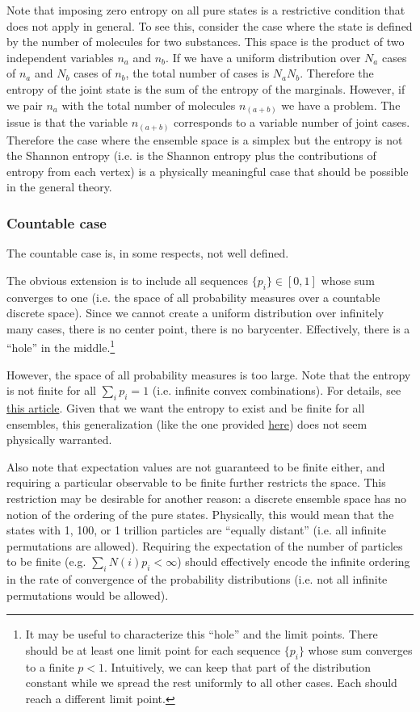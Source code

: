 Note that imposing zero entropy on all pure states is a restrictive condition that does not apply in general. To see this, consider the case where the state is defined by the number of molecules for two substances. This space is the product of two independent variables $n_a$ and $n_b$. If we have a uniform distribution over $N_a$ cases of $n_a$ and $N_b$ cases of $n_b$, the total number of cases is $N_a N_b$. Therefore the entropy of the joint state is the sum of the entropy of the marginals. However, if we pair $n_a$ with the total number of molecules $n_{(a+b)}$ we have a problem. The issue is that the variable $n_{(a+b)}$ corresponds to a variable number of joint cases. Therefore the case where the ensemble space is a simplex but the entropy is not the Shannon entropy (i.e. is the Shannon entropy plus the contributions of entropy from each vertex) is a physically meaningful case that should be possible in the general theory.

\subsubsection{Countable case}

The countable case is, in some respects, not well defined.

The obvious extension is to include all sequences $\{p_i\} \in [0,1]$ whose sum converges to one (i.e. the space of all probability measures over a countable discrete space). Since we cannot create a uniform distribution over infinitely many cases, there is no center point, there is no barycenter. Effectively, there is a ``hole'' in the middle.\footnote{It may be useful to characterize this ``hole'' and the limit points. There should be at least one limit point for each sequence $\{p_i\}$ whose sum converges to a finite $p < 1$. Intuitively, we can keep that part of the distribution constant while we spread the rest uniformly to all other cases. Each should reach a different limit point.}

However, the space of all probability measures is too large. Note that the entropy is not finite for all $\sum_i p_i =1$ (i.e. infinite convex combinations). For details, see \href{https://arxiv.org/pdf/1212.5630.pdf}{this article}. Given that we want the entropy to exist and be finite for all ensembles, this generalization (like the one provided \href{https://ncatlab.org/nlab/show/superconvex+space}{here}) does not seem physically warranted.

Also note that expectation values are not guaranteed to be finite either, and requiring a particular observable to be finite further restricts the space. This restriction may be desirable for another reason: a discrete ensemble space has no notion of the ordering of the pure states. Physically, this would mean that the states with 1, 100, or 1 trillion particles are ``equally distant'' (i.e. all infinite permutations are allowed). Requiring the expectation of the number of particles to be finite (e.g. $\sum_i N(i) p_i < \infty$) should effectively encode the infinite ordering in the rate of convergence of the probability distributions (i.e. not all infinite permutations would be allowed).


